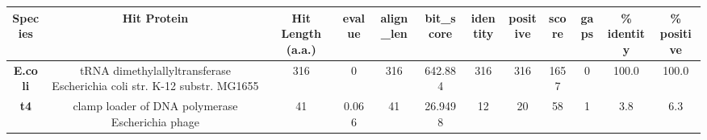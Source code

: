 \begin{tabular}{|c|c|c|c|c|c|c|c|c|c|c|c|} \hline
\textbf{Species} & \textbf{Hit Protein} & \textbf{Hit Length (a.a.)} & \textbf{evalue} & \textbf{align\_len} & \textbf{bit\_score} & \textbf{identity} & \textbf{positive} & \textbf{score} & \textbf{gaps} & \textbf{\% identity} & \textbf{\% positive} \\ \hline
\textbf{E.coli} & tRNA dimethylallyltransferase Escherichia coli str. K-12 substr. MG1655 & 316 & 0 & 316 & 642.884 & 316 & 316 & 1657 & 0 & 100.0 & 100.0\\
\textbf{t4} & clamp loader of DNA polymerase Escherichia phage  & 41 & 0.066 & 41 & 26.9498 & 12 & 20 & 58 & 1 & 3.8 & 6.3\\
\hline \end{tabular}
